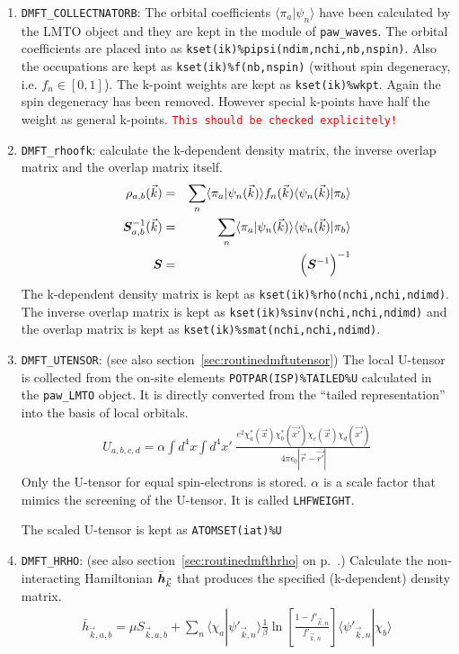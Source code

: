 \documentclass[11pt,a4paper]{report}
\newcommand{\petertt}[1]{\textcolor{red}{\texttt{#1}}}
\begin{document}
\begin{enumerate}
\item \verb|DMFT_COLLECTNATORB|: The orbital coefficients
  $\langle\pi_a|\psi_n\rangle$ have been calculated by the LMTO object
  and they are kept in the module of \verb|paw_waves|.  The orbital
  coefficients are placed into as 
  \verb|kset(ik)%pipsi(ndim,nchi,nb,nspin)|. Also the occupations are
  kept as \verb|kset(ik)%f(nb,nspin)| (without spin degeneracy,
  i.e. $f_n\in[0,1]$). The k-point weights are kept
  as \verb|kset(ik)%wkpt|. Again the spin degeneracy has been
  removed. However special k-points have half the weight as general
  k-points. \petertt{This should be checked explicitely!}
%
\item \verb|DMFT_rhoofk|: calculate the k-dependent density matrix,
  the inverse overlap matrix and the overlap matrix itself.
\begin{eqnarray}
\rho_{a,b}(\vec{k})&=&\sum_n
\langle\pi_a|\psi_n(\vec{k})\rangle f_n(\vec{k})
\langle\psi_n(\vec{k})|\pi_b\rangle
\\
\bm{S}^{-1}_{a,b}(\vec{k})&=&\sum_n
\langle\pi_a|\psi_n(\vec{k})\rangle 
\langle\psi_n(\vec{k})|\pi_b\rangle
\\
\bm{S}&=&\Bigl(\bm{S}^{-1}\Bigr)^{-1}
\end{eqnarray}
The k-dependent density matrix is kept as
\verb|kset(ik)%rho(nchi,nchi,ndimd)|. The inverse overlap matrix is
kept as \verb|kset(ik)%sinv(nchi,nchi,ndimd)| and the overlap matrix
is kept as \verb|kset(ik)%smat(nchi,nchi,ndimd)|.
%
\item \verb|DMFT_UTENSOR|: (see also
  section~\ref{sec:routinedmftutensor}) The local U-tensor is
  collected from the on-site elements \verb|POTPAR(ISP)%TAILED%U|
  calculated in the \verb|paw_LMTO| object. It is directly converted
  from the ``tailed representation'' into the basis of local orbitals.
\begin{eqnarray}
U_{a,b,c,d}=\alpha\int d^4x\int d^4x'\;
\frac{e^2\chi^*_a(\vec{x})\chi^*_b(\vec{x'})\chi_c(\vec{x})\chi_d(\vec{x'})}
{4\pi\epsilon_0|\vec{r}-\vec{r'}|}
\label{eq:defutensordmftobject}
\end{eqnarray}
Only the U-tensor for equal spin-electrons is stored. $\alpha$ is a
scale factor that mimics the screening of the U-tensor. It is called
\verb|LHFWEIGHT|.

The scaled U-tensor is kept as \verb|ATOMSET(iat)%U|
%
\item \verb|DMFT_HRHO|: (see also section~\ref{sec:routinedmfthrho} on
p.~\pageref{sec:routinedmfthrho}.) Calculate the non-interacting
Hamiltonian $\bar{\bm{h}}_{\vec{k}}$ that produces the specified
(k-dependent) density matrix.
\begin{eqnarray}
\bar{h}_{\vec{k},a,b}=\mu S_{\vec{k},a,b}+\sum_{n}
\langle\chi_a|\psi'_{\vec{k},n}\rangle\frac{1}{\beta}
\ln\left[\frac{1-f'_{\vec{k},n}}{f'_{\vec{k},n}}\right]
\langle\psi'_{\vec{k},n}|\chi_b\rangle
\end{eqnarray}


\end{enumerate}
\end{document}
